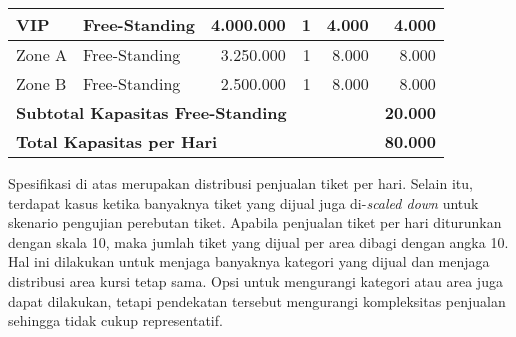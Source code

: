 \begin{longtable}{|l|l|r|r|r|r|}
    VIP                                                             & Free-Standing   & 4.000.000      & 1             & 4.000               & 4.000          \\
    \hline
    Zone A                                                          & Free-Standing   & 3.250.000      & 1             & 8.000               & 8.000          \\
    \hline
    Zone B                                                          & Free-Standing   & 2.500.000      & 1             & 8.000               & 8.000          \\
    \hline
    \multicolumn{5}{|l|}{\textbf{Subtotal Kapasitas Free-Standing}} & \textbf{20.000}                                                                         \\
    \hline \hline

    \multicolumn{5}{|l|}{\textbf{Total Kapasitas per Hari}}   & \textbf{80.000}                                                                         \\
\end{longtable}
\endgroup

Spesifikasi di atas merupakan distribusi penjualan tiket per hari. Selain itu, terdapat kasus ketika banyaknya tiket yang dijual juga di-\textit{scaled down} untuk skenario pengujian perebutan tiket. Apabila penjualan tiket per hari diturunkan dengan skala 10, maka jumlah tiket yang dijual per area dibagi dengan angka 10. Hal ini dilakukan untuk menjaga banyaknya kategori yang dijual dan menjaga distribusi area kursi tetap sama. Opsi untuk mengurangi kategori atau area juga dapat dilakukan, tetapi pendekatan tersebut mengurangi kompleksitas penjualan sehingga tidak cukup representatif.
